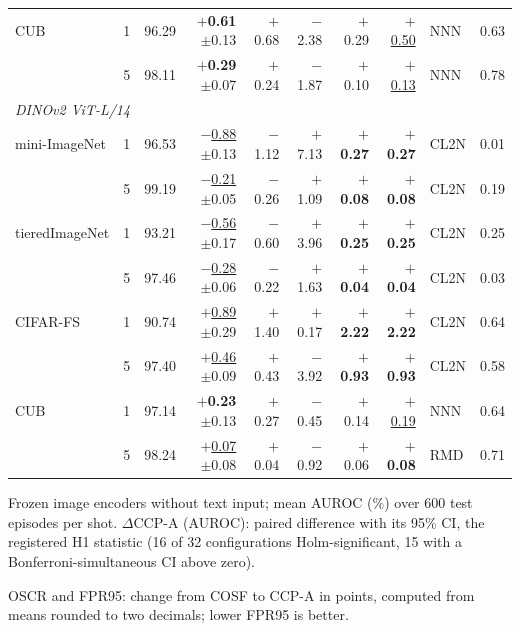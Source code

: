 \begin{table}[tbp]
\begin{tabular}{lcrrrrrrlr}
CUB & 1 & 96.29 & \textbf{\boldmath $+$0.61}{\tiny$\pm$0.13} & $+$0.68 & $-$2.38 & $+$0.29 & \underline{$+$0.50} & NNN & 0.63 \\
 & 5 & 98.11 & \textbf{\boldmath $+$0.29}{\tiny$\pm$0.07} & $+$0.24 & $-$1.87 & $+$0.10 & \underline{$+$0.13} & NNN & 0.78 \\
\midrule
\multicolumn{10}{l}{\textit{DINOv2 ViT-L/14}} \\
mini-ImageNet & 1 & 96.53 & \underline{$-$0.88}{\tiny$\pm$0.13} & $-$1.12 & $+$7.13 & \textbf{\boldmath $+$0.27} & \textbf{\boldmath $+$0.27} & CL2N & 0.01 \\
 & 5 & 99.19 & \underline{$-$0.21}{\tiny$\pm$0.05} & $-$0.26 & $+$1.09 & \textbf{\boldmath $+$0.08} & \textbf{\boldmath $+$0.08} & CL2N & 0.19 \\
tieredImageNet & 1 & 93.21 & \underline{$-$0.56}{\tiny$\pm$0.17} & $-$0.60 & $+$3.96 & \textbf{\boldmath $+$0.25} & \textbf{\boldmath $+$0.25} & CL2N & 0.25 \\
 & 5 & 97.46 & \underline{$-$0.28}{\tiny$\pm$0.06} & $-$0.22 & $+$1.63 & \textbf{\boldmath $+$0.04} & \textbf{\boldmath $+$0.04} & CL2N & 0.03 \\
CIFAR-FS & 1 & 90.74 & \underline{$+$0.89}{\tiny$\pm$0.29} & $+$1.40 & $+$0.17 & \textbf{\boldmath $+$2.22} & \textbf{\boldmath $+$2.22} & CL2N & 0.64 \\
 & 5 & 97.40 & \underline{$+$0.46}{\tiny$\pm$0.09} & $+$0.43 & $-$3.92 & \textbf{\boldmath $+$0.93} & \textbf{\boldmath $+$0.93} & CL2N & 0.58 \\
CUB & 1 & 97.14 & \textbf{\boldmath $+$0.23}{\tiny$\pm$0.13} & $+$0.27 & $-$0.45 & $+$0.14 & \underline{$+$0.19} & NNN & 0.64 \\
 & 5 & 98.24 & \underline{$+$0.07}{\tiny$\pm$0.08} & $+$0.04 & $-$0.92 & $+$0.06 & \textbf{\boldmath $+$0.08} & RMD & 0.71 \\
\bottomrule
\end{tabular}
\par\smallskip
\begin{minipage}{\linewidth}\scriptsize
Frozen image encoders without text input; mean AUROC (\%) over 600 test episodes per shot. $\Delta$CCP-A (AUROC): paired difference with its 95\% CI, the registered H1 statistic (16 of 32 configurations Holm-significant, 15 with a Bonferroni-simultaneous CI above zero).\par
OSCR and FPR95: change from COSF to CCP-A in points, computed from means rounded to two decimals; lower FPR95 is better.\par

\end{minipage}
\end{table}
